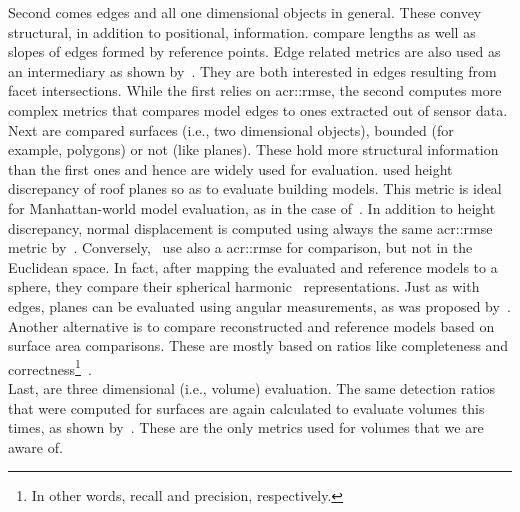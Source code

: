             Second comes edges and all one dimensional objects in general.
            These convey structural, in addition to positional, information.
            \textcite{kaartinen2005accuracy} compare lengths as well as slopes of edges formed by reference points.
            Edge related metrics are also used as an intermediary as shown by~\textcite{elberink2011quality,michelin2013quality}.
            They are both interested in edges resulting from facet intersections.
            While the first relies on \gls{acr::rmse}, the second computes more complex metrics that compares model edges to ones extracted out of sensor data.\\

            Next are compared surfaces (i.e., two dimensional objects), bounded (for example, polygons) or not (like planes).
            These hold more structural information than the first ones and hence are widely used for evaluation.
            \textcite{rottensteiner2014results} used height discrepancy of roof planes so as to evaluate building models.
            This metric is ideal for Manhattan-world model evaluation, as in the case of~\textcite{zebedin2008fusion}.
            In addition to height discrepancy, normal displacement is computed using always the same \gls{acr::rmse} metric by~\textcite{henricsson19973}.
            Conversely,~\textcite{zeng2014multicriteria} use also a \gls{acr::rmse} for comparison, but not in the Euclidean space.
            In fact, after mapping the evaluated and reference models to a sphere, they compare their spherical harmonic~\parencite{brechbuhler1995parametrization} representations.
            Just as with edges, planes can be evaluated using angular measurements, as was proposed by~\textcite{henricsson19973,landes2012quality}.
            Another alternative is to compare reconstructed and reference models based on surface area comparisons.
            These are mostly based on ratios like completeness and correctness\footnote{In other words, recall and precision, respectively.}~\parencite{henricsson19973,schuster2003new,landes2012quality,rottensteiner2014results}.\\

            Last, are three dimensional (i.e., volume) evaluation.
            The same detection ratios that were computed for surfaces are again calculated to evaluate volumes this times, as shown by~\textcite{jaynes2003recognition,mohamed2013quality, zeng2014multicriteria,nguatem2017modeling}.
            These are the only metrics used for volumes that we are aware of.\\

